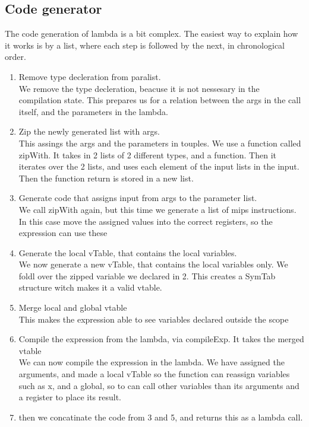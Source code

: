 \documentclass[11pt]{article}
\begin{document}
\subsection{Code generator}
The code generation of lambda is a bit complex. The easiest way to explain how it works
is by a list, where each step is followed by the next, in chronological order.
\begin{enumerate}
  \item Remove type decleration from paralist.\\
  We remove the type decleration, beacuse it is not nessesary in the compilation state. This
  prepares us for a relation between the args in the call itself, and the parameters in the
  lambda.
  \item Zip the newly generated list with args.\\
  This assings the args and the parameters in touples. We use a function called zipWith.
  It takes in 2 lists of 2 different types, and a function. Then it iterates over the 2 lists,
  and uses each element of the input lists in the input. Then the function return is stored in
  a new list.
  \item Generate code that assigns input from args to the parameter list.\\
  We call zipWith again, but this time we generate a list of mips instructions. In this case
  move the assigned values into the correct registers, so the expression can use these
  \item Generate the local vTable, that contains the local variables.\\
  We now generate a new vTable, that contains the local variables only. We foldl over the zipped
  variable we declared in 2. This creates a SymTab structure witch makes it a valid vtable.
 \item Merge local and global vtable\\
 This makes the expression able to see variables declared outside the scope  
  \item Compile the expression from the lambda, via compileExp. It takes the merged vtable\\
  We can now compile the expression in the lambda. We have assigned the arguments, and made a
  local vTable so the function can reassign variables such as x, and a global, so to can call
  other variables than its arguments
  and a register to place its result.
  \item then we concatinate the code from 3 and 5, and returns this as a lambda call.
\end{enumerate}
\end{document}
